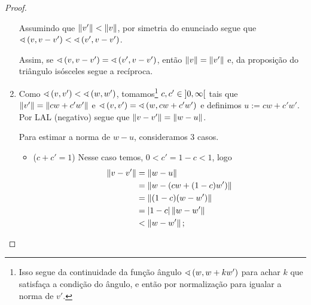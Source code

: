 \begin{proof}
\begin{enumerate}
	Assumindo que $\left\Vert{v'}\right\Vert < \left\Vert{v}\right\Vert$, por simetria do enunciado segue que $\sphericalangle\left({v},{v-v'}\right) < \sphericalangle\left({v'},{v-v'}\right)$.

	Assim, se $\sphericalangle\left({v},{v-v'}\right) = \sphericalangle\left({v'},{v-v'}\right)$, então $\left\Vert{v}\right\Vert=\left\Vert{v'}\right\Vert$ e, da proposição do triângulo isósceles segue a recíproca.

	\item Como $\sphericalangle\left({v},{v'}\right) < \sphericalangle\left({w},{w'}\right)$, tomamos\footnote{Isso segue da continuidade da função ângulo $\sphericalangle\left({w},{w+kw'}\right)$ para achar $k$ que satisfaça a condição do ângulo, e então por normalização para igualar a norma de $v'$.} $c,c' \in \left]{0},{\infty}\right[$ tais que $\left\Vert{v'}\right\Vert = \left\Vert{cw+c'w'}\right\Vert$ e $\sphericalangle\left({v},{v'}\right) = \sphericalangle\left({w},{cw+c'w'}\right)$ e definimos $u := cw+c'w'$. Por LAL (negativo) segue que $\left\Vert{v-v'}\right\Vert = \left\Vert{w-u}\right\Vert$.
	
	Para estimar a norma de $w-u$, consideramos $3$ casos.
		\begin{itemize}
		\item ($c+c' = 1$) Nesse caso temos, $0 < c' = 1-c < 1$, logo
			\begin{align*}
			\left\Vert{v-v'}\right\Vert &= \left\Vert{w-u}\right\Vert \\
				&= \left\Vert{w-(cw+(1-c)w')}\right\Vert \\
				&= \left\Vert{(1-c)(w-w')}\right\Vert \\
				&= \left\vert{1-c}\right\vert\left\Vert{w-w'}\right\Vert \\
				&< \left\Vert{w-w'}\right\Vert;
			\end{align*}
		

\end{itemize}
\end{enumerate}
\end{proof}
